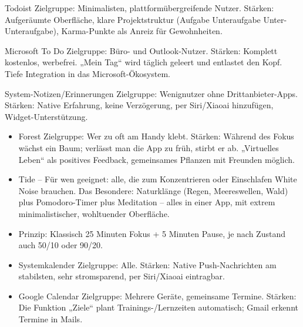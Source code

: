Todoist Zielgruppe: Minimalisten, plattformübergreifende Nutzer. Stärken: Aufgeräumte Oberfläche, klare Projektstruktur (Aufgabe Unteraufgabe Unter-Unteraufgabe), Karma-Punkte als Anreiz für Gewohnheiten.

Microsoft To Do Zielgruppe: Büro- und Outlook-Nutzer. Stärken: Komplett kostenlos, werbefrei. „Mein Tag“ wird täglich geleert und entlastet den Kopf. Tiefe Integration in das Microsoft-Ökosystem.

System-Notizen/Erinnerungen Zielgruppe: Wenignutzer ohne Drittanbieter-Apps. Stärken: Native Erfahrung, keine Verzögerung, per Siri/Xiaoai hinzufügen, Widget-Unterstützung.


\begin{itemize}
  \item Forest Zielgruppe: Wer zu oft am Handy klebt. Stärken: Während des Fokus wächst ein Baum; verlässt man die App zu früh, stirbt er ab. „Virtuelles Leben“ als positives Feedback, gemeinsames Pflanzen mit Freunden möglich.
  \item Tide – Für wen geeignet: alle, die zum Konzentrieren oder Einschlafen White Noise brauchen. Das Besondere: Naturklänge (Regen, Meereswellen, Wald) plus Pomodoro-Timer plus Meditation – alles in einer App, mit extrem minimalistischer, wohltuender Oberfläche.
  \item Prinzip: Klassisch 25 Minuten Fokus + 5 Minuten Pause, je nach Zustand auch 50/10 oder 90/20.
\end{itemize}


\begin{itemize}
  \item Systemkalender Zielgruppe: Alle. Stärken: Native Push-Nachrichten am stabilsten, sehr stromsparend, per Siri/Xiaoai eintragbar.
  \item Google Calendar Zielgruppe: Mehrere Geräte, gemeinsame Termine. Stärken: Die Funktion „Ziele“ plant Trainings-/Lernzeiten automatisch; Gmail erkennt Termine in Mails.
\end{itemize}


